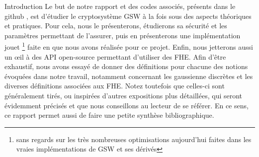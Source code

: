 \begin{section}{Introduction}
Le but de notre rapport et des codes associés, présents dans le github \cite{github_projet}, est d'étudier 
le cryptosystème GSW à la fois sous des aspects théoriques et pratiques. 
Pour cela, nous le présenterons, étudierons sa sécurité et les paramètres permettant de l'assurer, puis en présenterons une implémentation jouet
\footnote{sans regards sur les très nombreuses optimisations aujourd'hui faites dans les vraies implémentations
de GSW et ses dérivés} faite en  que nous avons réalisée pour ce projet.
Enfin, nous jetterons aussi un \oe{}il à des API open-source permettant d'utiliser des FHE.
Afin d'être exhaustif, nous avons essayé de donner des définitions pour chacune des notions évoquées dans notre travail,
notamment concernant les gaussienne discrètes et les diverses définitions associées aux FHE. Notez toutefois que 
celles-ci sont généralement tirés, ou inspirées d'autres expositions plus détaillées, qui seront évidemment précisés
et que nous conseillons au lecteur de se référer. En ce sens, ce rapport permet aussi de faire une petite synthèse 
bibliographique.
\end{section}
